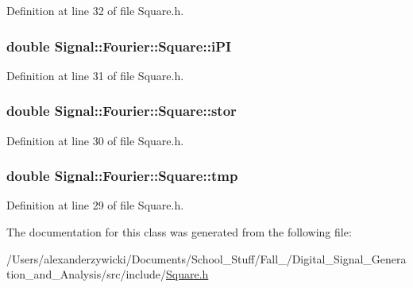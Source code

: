 Definition at line 32 of file Square.\+h.

\hypertarget{classSignal_1_1Fourier_1_1Square_a78d566d8c876456c115c9160ea0eacd2}{
\subsubsection[{i\+P\+I}]{\setlength{\rightskip}{0pt plus 5cm}double Signal\+::\+Fourier\+::\+Square\+::i\+P\+I\hspace{0.3cm}{\ttfamily [protected]}}}\label{classSignal_1_1Fourier_1_1Square_a78d566d8c876456c115c9160ea0eacd2}


Definition at line 31 of file Square.\+h.

\hypertarget{classSignal_1_1Fourier_1_1Square_a47ec083d36cef49c7d6583c8741b7905}{
\subsubsection[{stor}]{\setlength{\rightskip}{0pt plus 5cm}double Signal\+::\+Fourier\+::\+Square\+::stor\hspace{0.3cm}{\ttfamily [protected]}}}\label{classSignal_1_1Fourier_1_1Square_a47ec083d36cef49c7d6583c8741b7905}


Definition at line 30 of file Square.\+h.

\hypertarget{classSignal_1_1Fourier_1_1Square_a4fd9ac83ead8150ace9aadffb7c9e47f}{
\subsubsection[{tmp}]{\setlength{\rightskip}{0pt plus 5cm}double Signal\+::\+Fourier\+::\+Square\+::tmp\hspace{0.3cm}{\ttfamily [protected]}}}\label{classSignal_1_1Fourier_1_1Square_a4fd9ac83ead8150ace9aadffb7c9e47f}


Definition at line 29 of file Square.\+h.



The documentation for this class was generated from the following file\+:\begin{DoxyCompactItemize}
\item 
/\+Users/alexanderzywicki/\+Documents/\+School\+\_\+\+Stuff/\+Fall\+\_/\+Digital\+\_\+\+Signal\+\_\+\+Generation\+\_\+and\+\_\+\+Analysis/src/include/\hyperlink{Square_8h}{Square.\+h}\end{DoxyCompactItemize}
